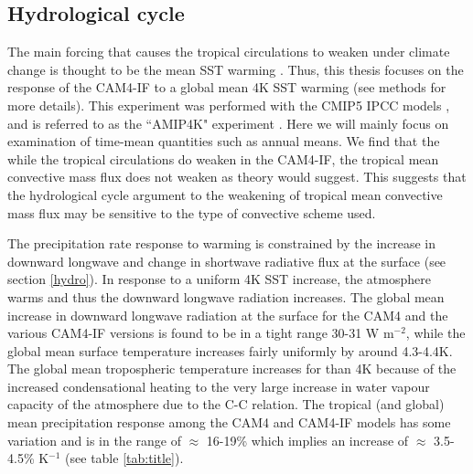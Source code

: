 \documentclass[letterpaper,12pt,titlepage,oneside,final]{book}
\begin{document}
\subsection{Hydrological cycle}

The main forcing that causes the tropical circulations to weaken under climate change is thought to be the mean SST warming \citep{he_anthropogenic_2015}. Thus, this thesis focuses on the response of the CAM4-IF to a global mean 4K SST warming (see methods for more details). This experiment was performed with the CMIP5 IPCC models \citep{taylor_overview_2011}, and is referred to as the ``AMIP4K" experiment \citep{bony_cfmip:_2011}. Here we will mainly focus on examination of time-mean quantities such as annual means. We find that the while the tropical circulations do weaken in the CAM4-IF, the tropical mean convective mass flux does not weaken as theory would suggest. This suggests that the hydrological cycle argument to the weakening of tropical mean convective mass flux may be sensitive to the type of convective scheme used.

The precipitation rate response to warming is constrained by the increase in downward longwave and change in shortwave radiative flux at the surface (see section \ref{hydro}). In response to a uniform 4K SST increase, the atmosphere warms and thus the downward longwave radiation increases. The global mean increase in downward longwave radiation at the surface for the CAM4 and the various CAM4-IF versions is found to be in a tight range 30-31 W m$^{-2}$, while the global mean surface temperature increases fairly uniformly by around 4.3-4.4K. The global mean tropospheric temperature increases for than 4K because of the increased condensational heating to the very large increase in water vapour capacity of the atmosphere due to the C-C relation. The tropical (and global) mean precipitation response among the CAM4 and CAM4-IF models has some variation and is in the range of $\approx$ 16-19\% which implies an increase of $\approx$ 3.5-4.5\% K$^{-1}$ (see table \ref{tab:title}).
\end{document}

